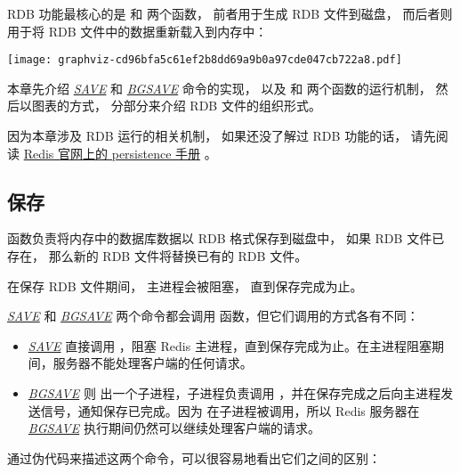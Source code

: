 \documentclass[a4paper,11pt,english]{sphinxmanual}
\begin{document}
RDB 功能最核心的是  和  两个函数，
前者用于生成 RDB 文件到磁盘，
而后者则用于将 RDB 文件中的数据重新载入到内存中：

\texttt{[image: graphviz-cd96bfa5c61ef2b8dd69a9b0a97cde047cb722a8.pdf]}

本章先介绍 \href{http://redis.readthedocs.org/en/latest/server/save.html\#save}{\emph{SAVE}} 和 \href{http://redis.readthedocs.org/en/latest/server/bgsave.html\#bgsave}{\emph{BGSAVE}} 命令的实现，
以及  和  两个函数的运行机制，
然后以图表的方式，
分部分来介绍 RDB 文件的组织形式。

因为本章涉及 RDB 运行的相关机制，
如果还没了解过 RDB 功能的话，
请先阅读 \href{http://redis.io/topics/persistence}{Redis 官网上的 persistence 手册} 。


\subsection{保存}
\label{internal/rdb:id2}
 函数负责将内存中的数据库数据以 RDB 格式保存到磁盘中，
如果 RDB 文件已存在，
那么新的 RDB 文件将替换已有的 RDB 文件。

在保存 RDB 文件期间，
主进程会被阻塞，
直到保存完成为止。

\href{http://redis.readthedocs.org/en/latest/server/save.html\#save}{\emph{SAVE}} 和 \href{http://redis.readthedocs.org/en/latest/server/bgsave.html\#bgsave}{\emph{BGSAVE}} 两个命令都会调用  函数，但它们调用的方式各有不同：
\begin{itemize}
\item {} 
\href{http://redis.readthedocs.org/en/latest/server/save.html\#save}{\emph{SAVE}} 直接调用  ，阻塞 Redis 主进程，直到保存完成为止。在主进程阻塞期间，服务器不能处理客户端的任何请求。

\item {} 
\href{http://redis.readthedocs.org/en/latest/server/bgsave.html\#bgsave}{\emph{BGSAVE}} 则  出一个子进程，子进程负责调用  ，并在保存完成之后向主进程发送信号，通知保存已完成。因为  在子进程被调用，所以 Redis 服务器在 \href{http://redis.readthedocs.org/en/latest/server/bgsave.html\#bgsave}{\emph{BGSAVE}} 执行期间仍然可以继续处理客户端的请求。

\end{itemize}

通过伪代码来描述这两个命令，可以很容易地看出它们之间的区别：
\end{document}
